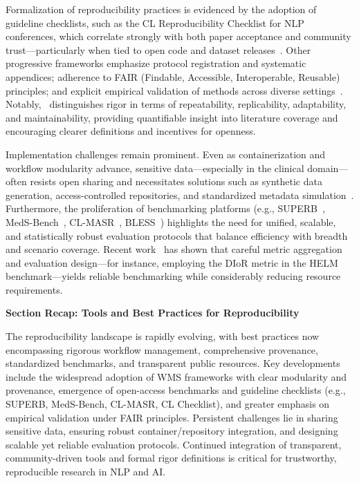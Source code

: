\documentclass[sigconf]{acmart}
\begin{document}
Formalization of reproducibility practices is evidenced by the adoption of guideline checklists, such as the CL Reproducibility Checklist for NLP conferences, which correlate strongly with both paper acceptance and community trust---particularly when tied to open code and dataset releases~\cite{ref33,ref108}. Other progressive frameworks emphasize protocol registration and systematic appendices; adherence to FAIR (Findable, Accessible, Interoperable, Reusable) principles; and explicit empirical validation of methods across diverse settings~\cite{ref66,ref67,ref82}. Notably,~\cite{ref67} distinguishes rigor in terms of repeatability, replicability, adaptability, and maintainability, providing quantifiable insight into literature coverage and encouraging clearer definitions and incentives for openness.

Implementation challenges remain prominent. Even as containerization and workflow modularity advance, sensitive data---especially in the clinical domain---often resists open sharing and necessitates solutions such as synthetic data generation, access-controlled repositories, and standardized metadata simulation~\cite{ref108}. Furthermore, the proliferation of benchmarking platforms (e.g., SUPERB~\cite{ref101}, MedS-Bench~\cite{ref95}, CL-MASR~\cite{ref102}, BLESS~\cite{ref106}) highlights the need for unified, scalable, and statistically robust evaluation protocols that balance efficiency with breadth and scenario coverage. Recent work~\cite{ref104} has shown that careful metric aggregation and evaluation design---for instance, employing the DIoR metric in the HELM benchmark---yields reliable benchmarking while considerably reducing resource requirements.

\medskip
\noindent\textbf{Section Recap: Tools and Best Practices for Reproducibility}

The reproducibility landscape is rapidly evolving, with best practices now encompassing rigorous workflow management, comprehensive provenance, standardized benchmarks, and transparent public resources. Key developments include the widespread adoption of WMS frameworks with clear modularity and provenance, emergence of open-access benchmarks and guideline checklists (e.g., SUPERB, MedS-Bench, CL-MASR, CL Checklist), and greater emphasis on empirical validation under FAIR principles. Persistent challenges lie in sharing sensitive data, ensuring robust container/repository integration, and designing scalable yet reliable evaluation protocols. Continued integration of transparent, community-driven tools and formal rigor definitions is critical for trustworthy, reproducible research in NLP and AI.
\end{document}
